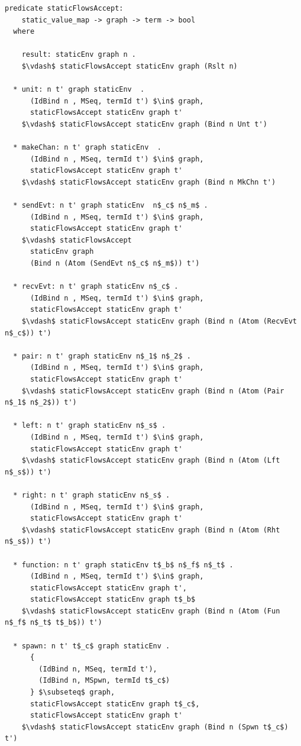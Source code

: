 \documentclass[letterpaper, 11pt]{report}
\begin{document}
\begin{lstlisting}[language=logic, mathescape]
  predicate staticFlowsAccept:
    static_value_map -> graph -> term -> bool
  where

    result: staticEnv graph n .
    $\vdash$ staticFlowsAccept staticEnv graph (Rslt n)

  * unit: n t' graph staticEnv  .
      (IdBind n , MSeq, termId t') $\in$ graph,
      staticFlowsAccept staticEnv graph t'
    $\vdash$ staticFlowsAccept staticEnv graph (Bind n Unt t')

  * makeChan: n t' graph staticEnv  .
      (IdBind n , MSeq, termId t') $\in$ graph,
      staticFlowsAccept staticEnv graph t'
    $\vdash$ staticFlowsAccept staticEnv graph (Bind n MkChn t')

  * sendEvt: n t' graph staticEnv  n$_c$ n$_m$ .
      (IdBind n , MSeq, termId t') $\in$ graph, 
      staticFlowsAccept staticEnv graph t'
    $\vdash$ staticFlowsAccept
      staticEnv graph
      (Bind n (Atom (SendEvt n$_c$ n$_m$)) t')

  * recvEvt: n t' graph staticEnv n$_c$ .
      (IdBind n , MSeq, termId t') $\in$ graph,
      staticFlowsAccept staticEnv graph t'
    $\vdash$ staticFlowsAccept staticEnv graph (Bind n (Atom (RecvEvt n$_c$)) t')

  * pair: n t' graph staticEnv n$_1$ n$_2$ .
      (IdBind n , MSeq, termId t') $\in$ graph,
      staticFlowsAccept staticEnv graph t'
    $\vdash$ staticFlowsAccept staticEnv graph (Bind n (Atom (Pair n$_1$ n$_2$)) t')

  * left: n t' graph staticEnv n$_s$ .
      (IdBind n , MSeq, termId t') $\in$ graph,
      staticFlowsAccept staticEnv graph t'
    $\vdash$ staticFlowsAccept staticEnv graph (Bind n (Atom (Lft n$_s$)) t')

  * right: n t' graph staticEnv n$_s$ .
      (IdBind n , MSeq, termId t') $\in$ graph,
      staticFlowsAccept staticEnv graph t'
    $\vdash$ staticFlowsAccept staticEnv graph (Bind n (Atom (Rht n$_s$)) t')

  * function: n t' graph staticEnv t$_b$ n$_f$ n$_t$ .
      (IdBind n , MSeq, termId t') $\in$ graph,
      staticFlowsAccept staticEnv graph t', 
      staticFlowsAccept staticEnv graph t$_b$
    $\vdash$ staticFlowsAccept staticEnv graph (Bind n (Atom (Fun n$_f$ n$_t$ t$_b$)) t')

  * spawn: n t' t$_c$ graph staticEnv .
      {
        (IdBind n, MSeq, termId t'),
        (IdBind n, MSpwn, termId t$_c$)
      } $\subseteq$ graph, 
      staticFlowsAccept staticEnv graph t$_c$, 
      staticFlowsAccept staticEnv graph t'
    $\vdash$ staticFlowsAccept staticEnv graph (Bind n (Spwn t$_c$) t')


\end{lstlisting}
\end{document}
